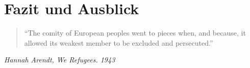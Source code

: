 \section{Fazit und Ausblick}


\begin{quote}
    ``The comity of European peoples went to pieces when, and because, it allowed its weakest member to be excluded and persecuted.''
\end{quote}
\centerline{\textit{Hannah Arendt, \textit{We Refugees}. 1943}}
